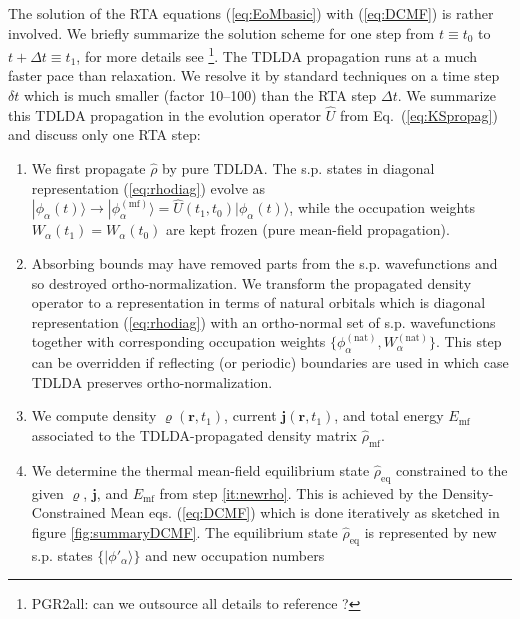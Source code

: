 \documentclass[final,1p]{elsarticle}
\newcommand{\PGRfoot}[1]{{\color{blue}\footnote{\color{blue} #1}}}
\begin{document}
The solution of the RTA equations (\ref{eq:EoMbasic}) with
(\ref{eq:DCMF}) is rather involved. We briefly summarize the solution
scheme for one step from $t\equiv t_0$ to $t\!+\!\Delta t\equiv t_1$,
for more details see \cite{Rei15a}\PGRfoot{PGR2all: can we outsource
  all details to reference \cite{Rei15a}?}.
The TDLDA propagation runs at a much faster pace than relaxation.  We
resolve it by standard techniques \cite{Cal00,Rei04aB} on a time step
$\delta t$ which is much smaller (factor 10--100) than the RTA step
$\Delta t$. We summarize this TDLDA propagation in the evolution
operator $\hat{U}$ from Eq.~(\ref{eq:KSpropag}) and discuss only one
RTA step:
\begin{enumerate}
   \item\label{it:TDLDA} We first propagate $\hat{\rho}$ by pure
     TDLDA.  The s.p. states in diagonal representation
     (\ref{eq:rhodiag}) evolve as $|\phi_\alpha(t)\rangle\rightarrow
     |\phi_\alpha^\mathrm{(mf)}\rangle=\hat{U}(t_1,t_0)|\phi_\alpha(t)\rangle$,
     while the occupation weights $W_\alpha(t_1)=W_\alpha(t_0)$ are
     kept frozen (pure mean-field propagation).
   \item\label{it:natorb} Absorbing bounds may have removed parts from
     the s.p. wavefunctions and so destroyed ortho-normalization.  We
     transform the propagated density operator to a representation in
     terms of natural orbitals which is diagonal representation
     (\ref{eq:rhodiag}) with an ortho-normal set of s.p. wavefunctions
     together with corresponding occupation weights
     $\{\phi_\alpha^\mathrm{(nat)},W_\alpha^\mathrm{(nat)}\}$.  This
     step can be overridden if reflecting (or periodic) boundaries are
     used in which case TDLDA preserves ortho-normalization.
   \item\label{it:newrho} We compute density
     $\varrho(\mathbf{r},t_1)$, current
     $\mathbf{j}(\mathbf{r},t_1)$, and total energy
     $E_\mathrm{mf}$ associated to the TDLDA-propagated density matrix
     $\hat{\rho}_\mathrm{mf}$.
   \item\label{it:DCMF} We determine the thermal mean-field
     equilibrium state $\hat{\rho}_\mathrm{eq}$ constrained to the
     given $\varrho$, $\mathbf{j}$, and $E_\mathrm{mf}$ from step
     \ref{it:newrho}.  This is achieved by the Density-Constrained
     Mean eqs. (\ref{eq:DCMF}) which is done iteratively as sketched
     in figure \ref{fig:summaryDCMF}.  The equilibrium state
     $\hat{\rho}_\mathrm{eq}$ is represented by new s.p. states
     $\{|\phi'_{\alpha}\rangle\}$ and new occupation numbers

\end{enumerate}
\end{document}
